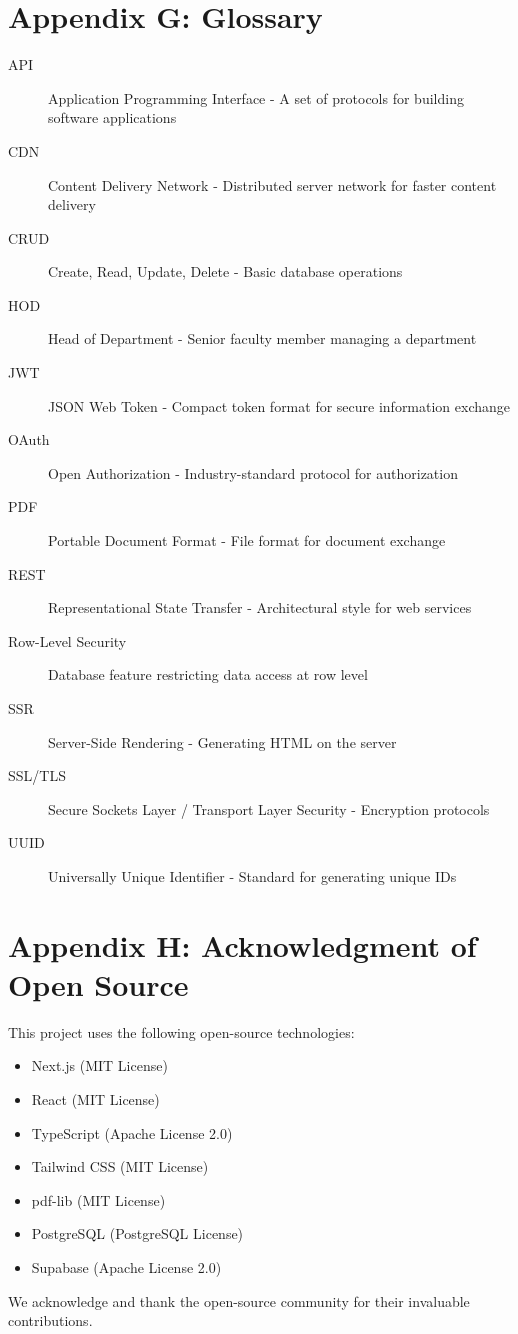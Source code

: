 \section{Appendix G: Glossary}

\begin{description}
\item[API] Application Programming Interface - A set of protocols for building software applications
\item[CDN] Content Delivery Network - Distributed server network for faster content delivery
\item[CRUD] Create, Read, Update, Delete - Basic database operations
\item[HOD] Head of Department - Senior faculty member managing a department
\item[JWT] JSON Web Token - Compact token format for secure information exchange
\item[OAuth] Open Authorization - Industry-standard protocol for authorization
\item[PDF] Portable Document Format - File format for document exchange
\item[REST] Representational State Transfer - Architectural style for web services
\item[Row-Level Security] Database feature restricting data access at row level
\item[SSR] Server-Side Rendering - Generating HTML on the server
\item[SSL/TLS] Secure Sockets Layer / Transport Layer Security - Encryption protocols
\item[UUID] Universally Unique Identifier - Standard for generating unique IDs
\end{description}

\section{Appendix H: Acknowledgment of Open Source}

This project uses the following open-source technologies:

\begin{itemize}
\item Next.js (MIT License)
\item React (MIT License)
\item TypeScript (Apache License 2.0)
\item Tailwind CSS (MIT License)
\item pdf-lib (MIT License)
\item PostgreSQL (PostgreSQL License)
\item Supabase (Apache License 2.0)
\end{itemize}

We acknowledge and thank the open-source community for their invaluable contributions.

\newpage
